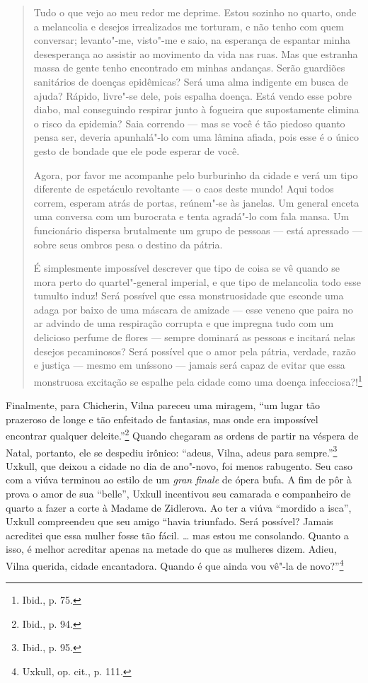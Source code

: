 \begin{quote}
Tudo o que vejo ao meu redor me deprime. Estou sozinho no quarto, onde a
melancolia e desejos irrealizados me torturam, e não tenho com quem
conversar; levanto"-me, visto"-me e saio, na esperança de espantar minha
desesperança ao assistir ao movimento da vida nas ruas. Mas que estranha
massa de gente tenho encontrado em minhas andanças. Serão guardiões
sanitários de doenças epidêmicas? Será uma alma indigente em busca de
ajuda? Rápido, livre"-se dele, pois espalha doença. Está vendo esse pobre
diabo, mal conseguindo respirar junto à fogueira que supostamente
elimina o risco da epidemia? Saia correndo --- mas se você é tão piedoso
quanto pensa ser, deveria apunhalá"-lo com uma lâmina afiada, pois esse é
o único gesto de bondade que ele pode esperar de você.

Agora, por favor me acompanhe pelo burburinho da cidade e verá um tipo
diferente de espetáculo revoltante --- o caos deste mundo! Aqui todos
correm, esperam atrás de portas, reúnem"-se às janelas. Um general enceta
uma conversa com um burocrata e tenta agradá"-lo com fala mansa. Um
funcionário dispersa brutalmente um grupo de pessoas --- está apressado ---
sobre seus ombros pesa o destino da pátria.

É simplesmente impossível descrever que tipo de coisa se vê quando se
mora perto do quartel"-general imperial, e que tipo de melancolia todo
esse tumulto induz! Será possível que essa monstruosidade que esconde
uma adaga por baixo de uma máscara de amizade --- esse veneno que paira no
ar advindo de uma respiração corrupta e que impregna tudo com um
delicioso perfume de flores --- sempre dominará as pessoas e incitará
nelas desejos pecaminosos? Será possível que o amor pela pátria,
verdade, razão e justiça --- mesmo em uníssono --- jamais será capaz de
evitar que essa monstruosa excitação se espalhe pela cidade como uma
doença infecciosa?!\footnote{Ibid., p. 75.}
\end{quote}

Finalmente, para Chicherin, Vilna pareceu uma miragem, ``um lugar tão
prazeroso de longe e tão enfeitado de fantasias, mas onde era impossível
encontrar qualquer deleite.''\footnote{Ibid., p. 94.} Quando chegaram as
ordens de partir na véspera de Natal, portanto, ele se despediu irônico:
``adeus, Vilna, adeus para sempre.''\footnote{Ibid., p. 95.} Uxkull, que
deixou a cidade no dia de ano"-novo, foi menos rabugento. Seu caso com a
viúva terminou ao estilo de um \emph{gran finale} de ópera bufa. A fim
de pôr à prova o amor de sua ``belle'', Uxkull incentivou seu camarada e
companheiro de quarto a fazer a corte à Madame de Zidlerova. Ao ter a
viúva ``mordido a isca'', Uxkull compreendeu que seu amigo ``havia
triunfado. Será possível? Jamais acreditei que essa mulher fosse tão
fácil. \ldots{} mas estou me consolando. Quanto a isso, é melhor
acreditar apenas na metade do que as mulheres dizem. Adieu, Vilna
querida, cidade encantadora. Quando é que ainda vou vê"-la de
novo?''\footnote{Uxkull, op. cit., p. 111.}

